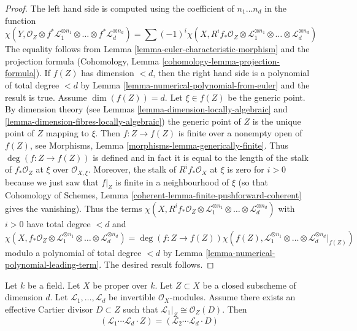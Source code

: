 \begin{proof}
The left hand side is computed using the coefficient of $n_1 \ldots n_d$
in the function
$$
\chi(Y, \mathcal{O}_Z \otimes f^*\mathcal{L}_1^{\otimes n_1} \otimes
\ldots \otimes f^*\mathcal{L}_d^{\otimes n_d}) =
\sum (-1)^i
\chi(X, R^if_*\mathcal{O}_Z \otimes
\mathcal{L}_1^{\otimes n_1} \otimes \ldots \otimes
\mathcal{L}_d^{\otimes n_d})
$$
The equality follows from Lemma \ref{lemma-euler-characteristic-morphism}
and the projection formula
(Cohomology, Lemma \ref{cohomology-lemma-projection-formula}).
If $f(Z)$ has dimension $< d$, then the right hand side
is a polynomial of total degree $<d$ by
Lemma \ref{lemma-numerical-polynomial-from-euler}
and the result is true. Assume $\dim(f(Z)) = d$. Let
$\xi \in f(Z)$ be the generic point. By
dimension theory (see Lemmas \ref{lemma-dimension-locally-algebraic} and
\ref{lemma-dimension-fibres-locally-algebraic})
the generic point of $Z$ is the unique point of $Z$ mapping to $\xi$.
Then $f : Z \to f(Z)$ is finite over a nonempty open of $f(Z)$, see
Morphisms, Lemma \ref{morphisms-lemma-generically-finite}.
Thus $\deg(f : Z \to f(Z))$ is defined and in fact it is equal
to the length of the stalk of $f_*\mathcal{O}_Z$ at $\xi$
over $\mathcal{O}_{X, \xi}$. Moreover, the stalk of
$R^if_*\mathcal{O}_X$ at $\xi$ is zero for $i > 0$ because
we just saw that $f|_Z$ is finite in a neighbourhood of $\xi$
(so that Cohomology of Schemes, Lemma
\ref{coherent-lemma-finite-pushforward-coherent} gives the vanishing).
Thus the terms $\chi(X, R^if_*\mathcal{O}_Z \otimes
\mathcal{L}_1^{\otimes n_1} \otimes \ldots \otimes
\mathcal{L}_d^{\otimes n_d})$ with $i > 0$ have total
degree $< d$ and
$$
\chi(X, f_*\mathcal{O}_Z \otimes
\mathcal{L}_1^{\otimes n_1} \otimes \ldots \otimes
\mathcal{L}_d^{\otimes n_d})
=
\deg(f : Z \to f(Z)) \chi(f(Z),
\mathcal{L}_1^{\otimes n_1} \otimes \ldots \otimes
\mathcal{L}_d^{\otimes n_d}|_{f(Z)})
$$
modulo a polynomial of total degree $< d$ by
Lemma \ref{lemma-numerical-polynomial-leading-term}.
The desired result follows.
\end{proof}

\begin{lemma}
\label{lemma-numerical-intersection-effective-Cartier-divisor}
Let $k$ be a field. Let $X$ be proper over $k$. Let $Z \subset X$ be
a closed subscheme of dimension $d$. Let $\mathcal{L}_1, \ldots, \mathcal{L}_d$
be invertible $\mathcal{O}_X$-modules. Assume there exists an
effective Cartier divisor $D \subset Z$ such that
$\mathcal{L}_1|_Z \cong \mathcal{O}_Z(D)$. Then
$$
(\mathcal{L}_1 \cdots \mathcal{L}_d \cdot Z) =
(\mathcal{L}_2 \cdots \mathcal{L}_d \cdot D)
$$
\end{lemma}

